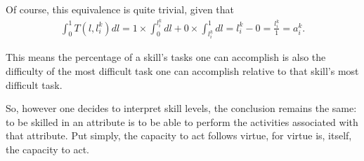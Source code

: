 {\begin{definition}[Skill]
        Of course, this equivalence is quite trivial, given that
        \begin{gather}
            \int_{0}^{1}{
            T(l, l_{i}^{k})
            dl
            }
            =
            1 \times \int_{0}^{l_{i}^{k}}{dl} +
            0 \times \int_{l_{i}^{k}}^{1}{dl}
            =
            l_{i}^{k} - 0
            =
            \frac{l_{i}^{k}}{1}
            =
            a_{i}^{k}
            .
        \end{gather}

        This means the percentage of a skill's tasks one can accomplish is also
        the difficulty of the most difficult task one can accomplish relative to that
        skill's most difficult task.

        So, however one decides to interpret skill levels, the conclusion remains the
        same: to be skilled in an attribute is to be able to perform the activities
        associated with that attribute. Put simply, the capacity to act follows virtue,
        for virtue is, itself, the capacity to act.
    \end{definition}
}


\newcommand{\ComplexTask}{
    \label{complex_task}

    \begin{definition}[Complex Task]
        dsds.
    \end{definition}
}


